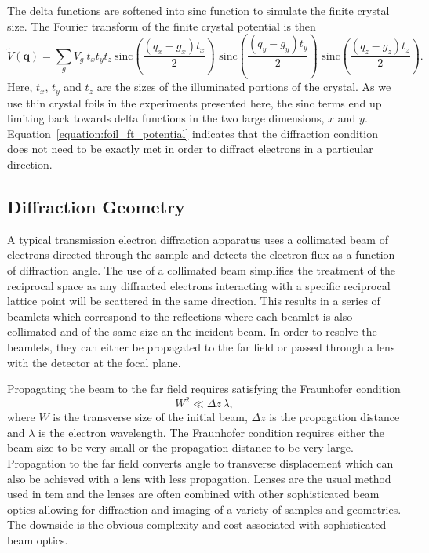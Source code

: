 The delta functions are softened into sinc function to simulate the finite crystal size.
The Fourier transform of the finite crystal potential is then
\begin{equation}\label{equation:foil_ft_potential}
\tilde{V}(\mathbf{q}) = \sum_g V_g \: t_x  t_y  t_z \: \text{sinc}{\left( \frac{(q_x-g_x)t_x}{2} \right)} \,\, \text{sinc}{\left( \frac{(q_y-g_y)t_y}{2} \right)} \,\, \text{sinc}{\left( \frac{(q_z-g_z)t_z}{2} \right)}.
\end{equation}
Here, $t_x$, $t_y$ and $t_z$ are the sizes of the illuminated portions of the crystal.
As we use thin crystal foils in the experiments presented here, the sinc terms end up limiting back towards delta functions in the two large dimensions, $x$ and $y$.
Equation~\ref{equation:foil_ft_potential} indicates that the diffraction condition does not need to be exactly met in order to diffract electrons in a particular direction.

\subsection{Diffraction Geometry}

A typical transmission electron diffraction apparatus uses a collimated beam of electrons directed through the sample and detects the electron flux as a function of diffraction angle.
The use of a collimated beam simplifies the treatment of the reciprocal space as any diffracted electrons interacting with a specific reciprocal lattice point will be scattered in the same direction.
This results in a series of beamlets which correspond to the reflections where each beamlet is also collimated and of the same size an the incident beam.
In order to resolve the beamlets, they can either be propagated to the far field or passed through a lens with the detector at the focal plane.

Propagating the beam to the far field requires satisfying the Fraunhofer condition
\begin{equation}
W^2 \ll \Delta z\,\lambda,
\end{equation}
where $W$ is the transverse size of the initial beam, $\Delta z$ is the propagation distance and $\lambda$ is the electron wavelength.
The Fraunhofer condition requires either the beam size to be very small or the propagation distance to be very large.
Propagation to the far field converts angle to transverse displacement which can also be achieved with a lens with less propagation.
Lenses are the usual method used in \gls{tem} and the lenses are often combined with other sophisticated beam optics allowing for diffraction and imaging of a variety of samples and geometries.
The downside is the obvious complexity and cost associated with sophisticated beam optics.


